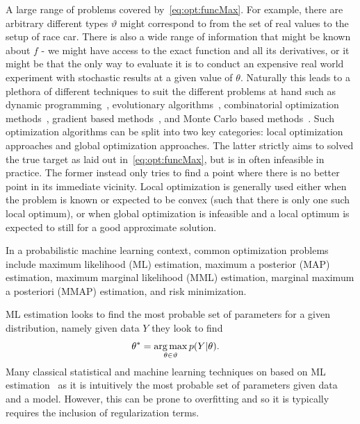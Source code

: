 A large range of problems covered by~\eqref{eq:opt:funcMax}.  For example, 
there are arbitrary different types $\vartheta$ might correspond to from the set of real
values to the setup of race car.  There is also a wide range of information that might
be known about $f$ - we might have access to the exact function and all its derivatives,
or it might be that the only way to evaluate it is to conduct an expensive real world 
experiment with stochastic results at a given value of $\theta$.  Naturally this leads 
to a plethora of different techniques to suit the different problems at hand such
as dynamic programming~\citep{bellman2013dynamic}, evolutionary 
algorithms~\citep{back1996evolutionary}, combinatorial optimization 
methods~\citep{papadimitriou1982combinatorial}, gradient based 
methods~\citep{boyd2004convex}, and Monte Carlo based methods~\citep{robert2004monte}.
Such optimization algorithms can be split into two key categories:
local optimization approaches and global optimization approaches.  
The latter strictly aims to solved the true target as laid out in~\eqref{eq:opt:funcMax}, but
is in often infeasible in practice.
The former instead only tries to find a point where there is no better point in its immediate vicinity. 
Local optimization is generally
used either when the problem is known or expected to be convex (such that there is only
one such local optimum), or when global optimization is infeasible and a local
optimum is expected to still for a good approximate solution.  

In a probabilistic machine learning context, common optimization problems 
include maximum likelihood (ML) estimation,
maximum a posterior (MAP) estimation, maximum marginal likelihood (MML) estimation, 
marginal maximum a posteriori (MMAP) estimation,
and risk minimization.  

ML estimation looks to find the most probable set of parameters
for a given distribution, namely given data $Y$ they look to find
\begin{align}
\label{eq:opt:max-lik}
\theta^* &= \operatorname*{arg\,max}_{\theta \in \vartheta} p(Y|\theta).
\end{align}
Many classical statistical and machine learning techniques on based on 
ML estimation~\cite{hastie01statisticallearning} as it is intuitively the most probable
set of parameters given data and a model.  However, this can be prone to overfitting and
so it is typically requires the inclusion of regularization terms.

